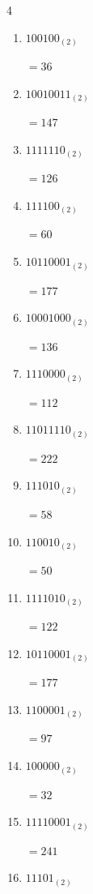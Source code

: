 \begin{multicols}{4}
\begin{enumerate}
        $=246$

\columnbreak %

  \item $100100_{(2)}$

        $=36$

  \item $10010011_{(2)}$

        $=147$

  \item $1111110_{(2)}$

        $=126$

  \item $111100_{(2)}$

        $=60$

  \item $10110001_{(2)}$

        $=177$

  \item $10001000_{(2)}$

        $=136$

  \item $1110000_{(2)}$

        $=112$

  \item $11011110_{(2)}$

        $=222$

  \item $111010_{(2)}$

        $=58$

  \item $110010_{(2)}$

        $=50$

  \item $1111010_{(2)}$

        $=122$

  \item $10110001_{(2)}$

        $=177$

  \item $1100001_{(2)}$

        $=97$

  \item $100000_{(2)}$

        $=32$

  \item $11110001_{(2)}$

        $=241$

\columnbreak %

  \item $11101_{(2)}$


\end{enumerate}
\end{multicols}
